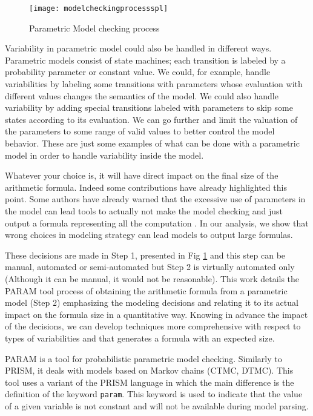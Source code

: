 \documentclass[conference]{IEEEtran}
\begin{document}
	\begin{figure}[!t]
	\centering
	\texttt{[image: modelcheckingprocessspl]}	
	\caption{Parametric Model checking process}
	\label{fig:modelcheckingprocessspl}
	\end{figure}

	Variability in parametric model could also be handled in different
	ways. Parametric models consist of state machines;
	each transition is labeled by a probability parameter or constant value.
	We could, for example, handle variabilities by labeling some transitions
	with parameters whose evaluation with different values changes
	the semantics of the model. We could also handle variability
	by adding special transitions labeled with parameters to skip some states
	according to its evaluation. We can go further and limit the valuation
	of the parameters to some range of valid values to better control
	the model behavior. These are just some examples of what can be done
	with a parametric model in order to handle variability inside the model.
	
	Whatever your choice is, it will have direct impact on the final size of 
	the arithmetic formula. Indeed some contributions have already highlighted this point.
	Some authors have already warned that the excessive
	use of parameters in the model can lead tools to actually not make the model
	checking and just output a formula representing all the computation \cite{paramthesis,GhezziSPLC}.
	In our analysis, we show that wrong
	choices in modeling strategy can lead models to output large formulas.
	
	These decisions are made in Step 1, presented in Fig \ref{fig:modelcheckingprocessspl} and
	this step can be manual, automated or semi-automated but Step 2 is virtually
	automated only (Although it can be manual, it would not be reasonable). 
	This work details the PARAM tool process of obtaining the arithmetic formula from a 
	parametric model (Step 2) emphasizing the modeling decisions and relating it to its actual
	impact on the formula size in a quantitative way.  Knowing in advance the impact of the decisions, we can develop techniques 
	more comprehensive with respect to types of variabilities and that 
	generates a formula with an expected size.
	
		PARAM is a tool for probabilistic parametric model checking. Similarly
	to PRISM, it deals with models based on Markov chains (CTMC, DTMC).	
	This tool uses a variant of the PRISM language in which the main difference 
	is the definition of the keyword \texttt{param}. This keyword is used to indicate that the
	value of a given variable is not constant and will not be available during
	model parsing.
		
\end{document}
